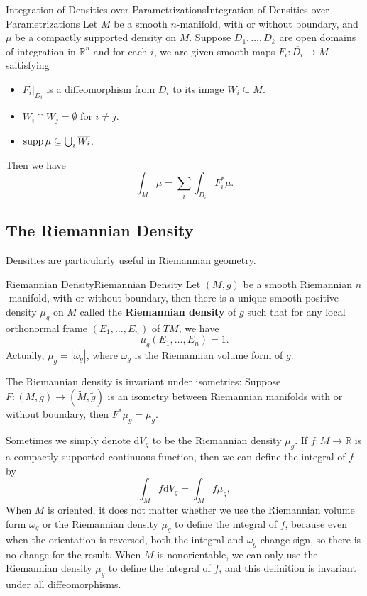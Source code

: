 \documentclass[../main.tex]{subfiles}
\begin{document}
\begin{proposition}{Integration of Densities over Parametrizations}{Integration of Densities over Parametrizations}
  Let $M$ be a smooth $n$-manifold, with or without boundary, and $\mu$ be a compactly supported density on $M$. Suppose $D_1, \ldots ,D_k$ are open domains of integration in $\mathbb{R}^n$ and for each $i$, we are given smooth maps $F_i: \overline{D_i} \to M$ saitisfying
  \begin{itemize}
    \item $F_i|_{D_i}$ is a diffeomorphism from $D_i$ to its image $W_i \subseteq M$.
    \item $W_i \cap W_j = \emptyset$ for $i\neq j$.
    \item $\operatorname{supp} \mu \subseteq \bigcup_i \overline{W_i}$.
  \end{itemize}
  Then we have
  \begin{equation}
    \int_M \mu = \sum_i \int_{D_i} F_i^* \mu.
  \end{equation}
\end{proposition}

\subsection{The Riemannian Density}
Densities are particularly useful in Riemannian geometry.

\begin{proposition}{Riemannian Density}{Riemannian Density}
  Let $(M,g)$ be a smooth Riemannian $n$-manifold, with or without boundary, then there is a unique smooth positive density $\mu_g$ on $M$ called the \textbf{Riemannian density} of $g$ such that for any local orthonormal frame $(E_1, \ldots , E_n)$ of $TM$, we have
  \begin{equation*}
    \mu_g (E_1, \ldots , E_n) = 1.
  \end{equation*}
  Actually, $\mu_g = |\omega_g|$, where $\omega_g$ is the Riemannian volume form of $g$.
\end{proposition}
The Riemannian density is invariant under isometries: Suppose $F: (M,g) \to (\tilde{M}, \tilde{g})$ is an isometry between Riemannian manifolds with or without boundary, then $F^* \mu_{\tilde{g}} = \mu_g$.

Sometimes we simply denote $\mathrm{d} V_g$ to be the Riemannian density $\mu_g$. If $f: M \to \mathbb{R}$ is a compactly supported continuous function, then we can define the integral of $f$ by
\begin{equation*}
  \int_M f \mathrm{d} V_g = \int_M f \mu_g,
\end{equation*}
When $M$ is oriented, it does not matter whether we use the Riemannian volume form $\omega_g$ or the Riemannian density $\mu_g$ to define the integral of $f$, because even when the orientation is reversed, both the integral and $\omega_g$ change sign, so there is no change for the result. When $M$ is nonorientable, we can only use the Riemannian density $\mu_g$ to define the integral of $f$, and this definition is invariant under all diffeomorphisms.
\end{document}
